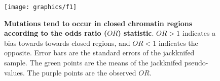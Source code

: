 \begin{figure}[h!]
    \centering
    \texttt{[image: graphics/f1]}
    \caption{\textbf{Mutations tend to occur in closed chromatin regions according to the odds ratio ($OR$) statistic}. $OR>1$ indicates a bias towards towards closed regions, and $OR<1$ indicates the opposite. Error bars are the standard errors of the jackknifed sample. The green points are the means of the jackknifed pseudo-values. The purple points are the observed $OR$.}
    \label{fig:or_jackknifed}
\end{figure}
